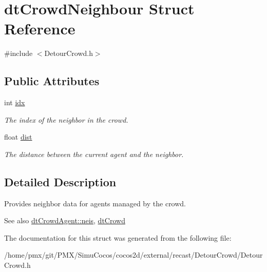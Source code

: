 \hypertarget{structdtCrowdNeighbour}{}\section{dt\+Crowd\+Neighbour Struct Reference}
\label{structdtCrowdNeighbour}


{\ttfamily \#include $<$Detour\+Crowd.\+h$>$}

\subsection*{Public Attributes}
\begin{DoxyCompactItemize}
\item 
\mbox{\label{structdtCrowdNeighbour_a6a4639002489c6b6e3709e2e6a217c7c}} 
int \hyperlink{structdtCrowdNeighbour_a6a4639002489c6b6e3709e2e6a217c7c}{idx}
\begin{DoxyCompactList}\small\item\em The index of the neighbor in the crowd. \end{DoxyCompactList}\item 
\mbox{\label{structdtCrowdNeighbour_aa3011f95ad242a684f2a79a1b41d5f6b}} 
float \hyperlink{structdtCrowdNeighbour_aa3011f95ad242a684f2a79a1b41d5f6b}{dist}
\begin{DoxyCompactList}\small\item\em The distance between the current agent and the neighbor. \end{DoxyCompactList}\end{DoxyCompactItemize}


\subsection{Detailed Description}
Provides neighbor data for agents managed by the crowd.

\begin{DoxySeeAlso}{See also}
\hyperlink{structdtCrowdAgent_a00fbfb7b00f0e352cb2c6486a97d8eb4}{dt\+Crowd\+Agent\+::neis}, \hyperlink{classdtCrowd}{dt\+Crowd} 
\end{DoxySeeAlso}


The documentation for this struct was generated from the following file\+:\begin{DoxyCompactItemize}
\item 
/home/pmx/git/\+P\+M\+X/\+Simu\+Cocos/cocos2d/external/recast/\+Detour\+Crowd/Detour\+Crowd.\+h\end{DoxyCompactItemize}
